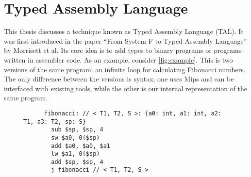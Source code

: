 \section{Typed Assembly Language}

This thesis discusses a technique known as Typed Assembly Language (TAL). It was
first introduced in the paper ``From System F to Typed Assembly Language'' by
Morrisett et al. Its core idea is to add types to binary programs or programs
written in assembler code. As an example, consider \cref{fig:example}. This is
two versions of the same program: an infinite loop for calculating Fibonacci
numbers. The only difference between the versions is syntax; one uses Mips and
can be interfaced with existing tools, while the other is our internal
representation of the same program.

\begin{figure}
\begin{verbatim}
      fibonacci: // < T1, T2, S >: {a0: int, a1: int, a2: T1, a3: T2, sp: S}
        sub $sp, $sp, 4
        sw $a0, 0($sp)
        add $a0, $a0, $a1
        lw $a1, 0($sp)
        add $sp, $sp, 4
        j fibonacci // < T1, T2, S >
\end{verbatim}


\end{figure}
